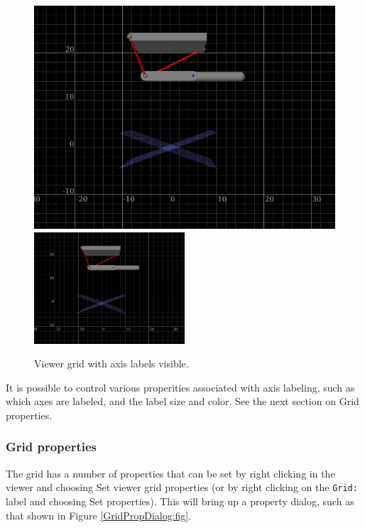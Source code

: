\documentclass{article}
\begin{document}
\begin{figure}[h]
\begin{center}
\iflatexml
\includegraphics[]{images/gridLabels}
\else
\includegraphics[width=0.50\textwidth]{images/gridLabels}
\fi
\end{center}
\caption{Viewer grid with axis labels visible.}%
\label{gridLabels:fig}
\end{figure}

It is possible to control various properities associated with
axis labeling, such as which axes are labeled, and the label size and
color. See the next section on {\sf Grid properties}.

\subsubsection{Grid properties}
\label{GridProperties}

The grid has a number of properties that can be set by right clicking
in the viewer and choosing {\sf Set viewer grid properties} (or by
right clicking on the {\tt Grid:} label and choosing {\sf Set
properties}). This will bring up a property dialog, such as that shown
in Figure \ref{GridPropDialog:fig}.
\end{document}
